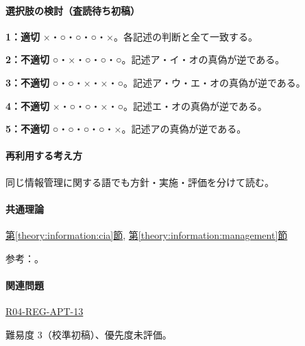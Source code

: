 \paragraph{選択肢の検討（査読待ち初稿）}\mbox{}\par

\noindent\textbf{1：適切} ×・○・○・○・×。各記述の判断と全て一致する。\par

\noindent\textbf{2：不適切} ○・×・○・○・○。記述ア・イ・オの真偽が逆である。\par

\noindent\textbf{3：不適切} ○・○・×・×・○。記述ア・ウ・エ・オの真偽が逆である。\par

\noindent\textbf{4：不適切} ×・○・○・×・○。記述エ・オの真偽が逆である。\par

\noindent\textbf{5：不適切} ○・○・○・○・×。記述アの真偽が逆である。\par

\paragraph{再利用する考え方} 同じ情報管理に関する語でも方針・実施・評価を分けて読む。

\paragraph{共通理論} \hyperref[theory:information:cia]{第\ref*{theory:information:cia}節}, \hyperref[theory:information:management]{第\ref*{theory:information:management}節}

\par 参考：\cite{iso27000_2009}。

\paragraph{関連問題} \hyperref[q:r04-reg-apt-13]{R04-REG-APT-13}

\par 難易度 3（校準初稿）、優先度未評価。
